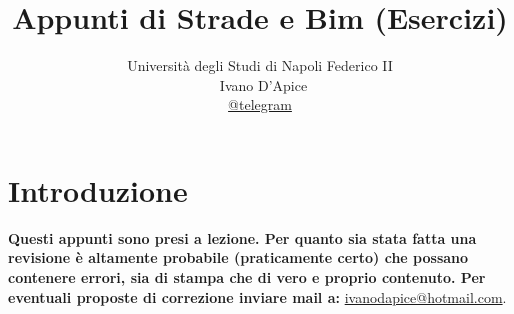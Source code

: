 \documentclass[
a4paper,
12pt, 
twoside]{scrbook}
\title{Appunti di Strade e Bim (Esercizi)}
\author{Università degli Studi di Napoli Federico II\\\ Ivano D'Apice\\\href{https://t.me/sonoivano}{@telegram}}
\date{}
\begin{document}
	\selectfont                                       %
	\maketitle                                                         %


    \renewcommand{\chaptermark}[1]{%
    	\markboth{\chaptername
    		\ \thechapter.\ #1}{}}
    \renewcommand{\sectionmark}[1]{\markright{\thesection.\ #1}}
    \newcommand{\floor}[1]{\lfloor #1 \rfloor}
    \newcommand{\MYhref}[3][blue]{\href{#2}{\color{#1}{#3}}}%

	


    \def\tagform@#1{\maketag@@@{\bfseries(\ignorespaces\textbf{#1}\unskip\@@italiccorr)}}
    \renewcommand{\eqref}[1]{\textup{{\normalfont(\ref{\textbf{#1}}}\normalfont)}}


	\chapter*{Introduzione}
	\textbf{Questi appunti sono presi a lezione. Per quanto sia stata fatta
		una revisione è altamente probabile (praticamente certo) che possano
		contenere errori, sia di stampa che di vero e proprio contenuto. Per
		eventuali proposte di correzione inviare mail a: }
	\url{ivanodapice@hotmail.com}.\\
	
\end{document}
